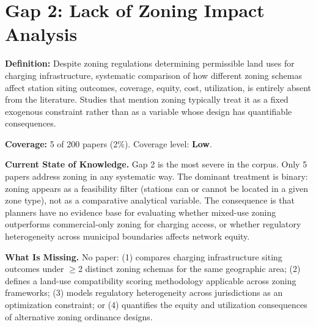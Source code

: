 \documentclass[letterpaper, 12pt, oneside, doublespacing]{Thesis}
\begin{document}
\section{Gap 2: Lack of Zoning Impact Analysis}


\noindent \textbf{Definition:} Despite zoning regulations determining permissible land uses for charging infrastructure, systematic comparison of how different zoning schemas affect station siting outcomes, coverage, equity, cost, utilization, is entirely absent from the literature. Studies that mention zoning typically treat it as a fixed exogenous constraint rather than as a variable whose design has quantifiable consequences.



\noindent \textbf{Coverage:} 5 of 200 papers (2\%). Coverage level: \textbf{Low}.



\noindent \textbf{Current State of Knowledge.} Gap 2 is the most severe in the corpus. Only 5 papers address zoning in any systematic way. The dominant treatment is binary: zoning appears as a feasibility filter (stations can or cannot be located in a given zone type), not as a comparative analytical variable. The consequence is that planners have no evidence base for evaluating whether mixed-use zoning outperforms commercial-only zoning for charging access, or whether regulatory heterogeneity across municipal boundaries affects network equity.



\noindent \textbf{What Is Missing.} No paper: (1) compares charging infrastructure siting outcomes under $\geq$2 distinct zoning schemas for the same geographic area; (2) defines a land-use compatibility scoring methodology applicable across zoning frameworks; (3) models regulatory heterogeneity across jurisdictions as an optimization constraint; or (4) quantifies the equity and utilization consequences of alternative zoning ordinance designs.
\end{document}
